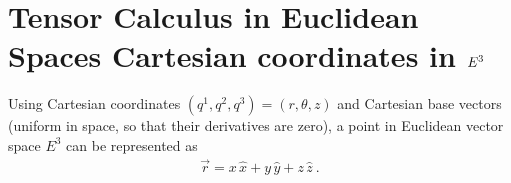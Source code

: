 \documentclass[letterpaper,10pt,english]{jupyterBook}
\begin{document}
\sphinxstepscope


\section{Tensor Calculus in Euclidean Spaces \sphinxhyphen{} Cartesian coordinates in \protect\(E^3\protect\)}
\label{\detokenize{ch/tensor-algebra-calculus/calculus-euclidean-cartesian:tensor-calculus-in-euclidean-spaces-cartesian-coordinates-in-e-3}}\label{\detokenize{ch/tensor-algebra-calculus/calculus-euclidean-cartesian:tensor-calculus-cartesian}}\label{\detokenize{ch/tensor-algebra-calculus/calculus-euclidean-cartesian::doc}}
\sphinxAtStartPar
Using Cartesian coordinates \((q^1, q^2, q^3) = (r, \theta, z)\) and Cartesian base vectors (uniform in space, so that their derivatives are zero), a point in Euclidean vector space \(E^3\) can be represented as
\begin{equation*}
\begin{split}\vec{r} = x \, \hat{x} + y \, \hat{y} + z \, \hat{z} \ .\end{split}
\end{equation*}
\end{document}

